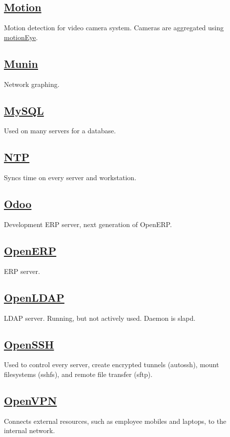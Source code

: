 \subsection{\href{http://motion.sf.net}{Motion}}
Motion detection for video camera system. Cameras are aggregated
using \href{https://bitbucket.org/ccrisan/motioneye/wiki/Home}{motionEye}.

\subsection{\href{http://munin-monitoring.org/}{Munin}}
Network graphing.

\subsection{\href{http://www.mysql.org/}{MySQL}}
Used on many servers for a database.

\subsection{\href{http://support.ntp.org/}{NTP}}
Syncs time on every server and workstation.

\subsection{\href{http://www.odoo.com/}{Odoo}}
Development ERP server, next generation of OpenERP.

\subsection{\href{http://www.openerp.org/}{OpenERP}}
ERP server.

\subsection{\href{http://www.openldap.org/}{OpenLDAP}}
LDAP server. Running, but not actively used. Daemon is slapd.

\subsection{\href{http://www.openssh.com/}{OpenSSH}}
Used to control every server, create encrypted tunnels (autossh),
mount filesystems (sshfs), and remote file transfer (sftp).

\subsection{\href{http://openvpn.net/}{OpenVPN}}
Connects external resources, such as employee mobiles and laptops, to the internal network.

